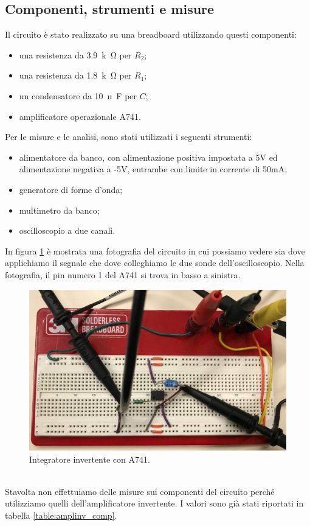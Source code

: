 \documentclass{report}
\begin{document}
\subsection{Componenti, strumenti e misure} 
Il circuito è stato realizzato su una breadboard utilizzando questi componenti:
\begin{itemize}
\item una resistenza da \SI{3.9}{k\ohm} per $R_2$;
\item una resistenza da \SI{1.8}{k\ohm} per $R_1$;
\item un condensatore da \SI{10}{n\farad} per $C$;
\item amplificatore operazionale \textmu A741.
\end{itemize}
Per le misure e le analisi, sono stati utilizzati i seguenti strumenti:
\begin{itemize}
\item alimentatore da banco, con alimentazione positiva impostata a 5V ed alimentazione negativa a -5V, entrambe con limite in corrente di 50mA;
\item generatore di forme d'onda;
\item multimetro da banco;
\item oscilloscopio a due canali.
\end{itemize}
In figura \ref{figura:foto_int} è mostrata una fotografia del circuito in cui possiamo vedere sia dove applichiamo il segnale che dove colleghiamo le due sonde dell'oscilloscopio. Nella fotografia, il pin numero 1 del \textmu A741 si trova in basso a sinistra.
\begin{figure}[h]
\centering
\includegraphics[height=7cm]{immagini/foto_int}
\caption{Integratore invertente con \textmu A741.}
\label{figura:foto_int}
\end{figure}
\\Stavolta non effettuiamo delle misure sui componenti del circuito perché utilizziamo quelli dell'amplificatore invertente. I valori sono già stati riportati in tabella \ref{table:amplinv_comp}.
\end{document}
